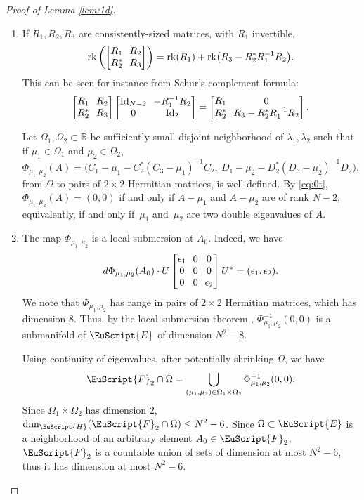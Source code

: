 \documentclass[10pt]{amsart}
\let\pazocal\EuScript
\theoremstyle{definition}
\DeclareMathOperator{\Id}{Id}
\DeclareMathOperator{\rk}{rk}
\newcommand{\FF}{\pazocal{F}}
\newcommand{\EE}{\pazocal{E}}
\newcommand{\HH}{\pazocal{H}}
\newcommand{\R}{\mathbb{R}}
\newcommand{\matrice}[1]{\arraycolsep3.5pt\begin{bmatrix}#1\end{bmatrix}}
\begin{document}
\begin{proof}[Proof of Lemma \ref{lem:1d}]
\begin{enumerate}
\item
If $R_1, R_2, R_3$ are consistently-sized matrices, with $R_1$ invertible,
\begin{equation*}
\rk \left(\matrice{R_1 & R_2 \\ R_2^* & R_3} \right) = \rk(R_1)+ \rk \bigl(R_3-R_2^* R_1^{-1}R_2\bigr).
\end{equation*}
This can be seen for instance from Schur's complement formula:
\begin{equation}\label{eq:0t}
\matrice{R_1 & R_2 \\ R_2^* & R_3} \matrice{\Id_{N-2} & -R_1^{-1}R_2 \\ 0 & \Id_2 } = \matrice{R_1 & 0 \\ R_2^* & R_3-R_2^* R_1^{-1}R_2}.
\end{equation}

Let $\Omega_1, \Omega_2 \subset \R$ be sufficiently small disjoint neighborhood of $\lambda_1, \lambda_2$ such that if $\mu_1 \in \Omega_1$ and $\mu_2 \in \Omega_2$,
\begin{equation*}
\Phi_{\mu_1,\mu_2}(A) = \bigl( C_1 - \mu_1 - C_2^* (C_3-\mu_1)^{-1} C_2, \ D_1 - \mu_2 - D_2^* (D_3-\mu_2)^{-1} D_2 \bigr),
\end{equation*}
from $\Omega$ to pairs of $2 \times 2$ Hermitian matrices, is well-defined. By \eqref{eq:0t}, $\Phi_{\mu_1,\mu_2}(A) = (0,0)$ if and only if $A-\mu_1$ and $A - \mu_2$ are of rank $N-2$; equivalently, if and only if~$\mu_1$ and~$\mu_2$ are two double eigenvalues of $A$.

\item
The map $\Phi_{\mu_1,\mu_2}$ is a local submersion at $A_0$. Indeed, we have
\begin{equation*}
d\Phi_{\mu_1,\mu_2}(A_0) \cdot U \matrice{\epsilon_1 & 0 & 0 \\ 0 & 0 & 0 \\ 0 & 0 & \epsilon_2 }U^* = (\epsilon_1,\epsilon_2).
\end{equation*}
We note that $\Phi_{\mu_1,\mu_2}$ has range in pairs of $2 \times 2$ Hermitian matrices, which has dimension $8$. Thus, by the local submersion theorem \cite[\S4]{GP74}, $\Phi_{\mu_1,\mu_2}^{-1}(0,0)$ is a submanifold of $\EE$ of dimension $N^2-8$.

Using continuity of eigenvalues, after potentially shrinking $\Omega$, we have
\begin{equation*}
\FF_2 \cap \Omega = \bigcup_{(\mu_1,\mu_2) \in \Omega_1 \times \Omega_2} \Phi_{\mu_1,\mu_2}^{-1}(0,0).
\end{equation*}
Since $\Omega_1 \times \Omega_2$ has dimension $2$, $\dim_\HH(\FF_2 \cap \Omega) \leq N^2-6$. Since $\Omega \subset \EE$ is a neighborhood of an arbitrary element $A_0 \in \FF_2$, $\FF_2$ is a countable union of sets of dimension at most $N^2-6$, thus it has dimension at most $N^2-6$.\qedhere
\end{enumerate}
\end{proof}
\end{document}
